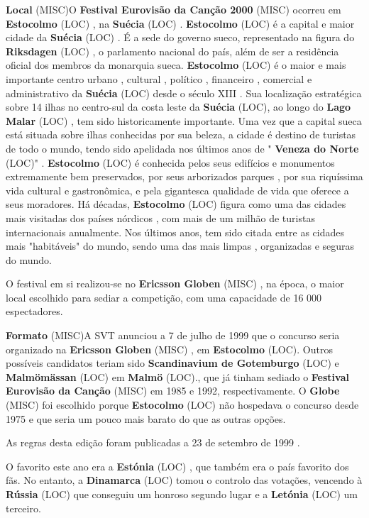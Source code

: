 \documentclass[12pt,a4paper]{article}
\begin{document}
\textbf{Local} (MISC)O \textbf{Festival Eurovisão da Canção 2000} (MISC) ocorreu em \textbf{Estocolmo} (LOC) , na \textbf{Suécia} (LOC) . \textbf{Estocolmo} (LOC) é a capital e maior cidade da \textbf{Suécia} (LOC) . É a sede do governo sueco, representado na figura do \textbf{Riksdagen} (LOC) , o parlamento nacional do país, além de ser a residência oficial dos membros da monarquia sueca. \textbf{Estocolmo} (LOC) é o maior e mais importante centro urbano , cultural , político , financeiro , comercial e administrativo da \textbf{Suécia} (LOC) desde o século XIII . Sua localização estratégica sobre 14 ilhas no centro-sul da costa leste da \textbf{Suécia} (LOC), ao longo do \textbf{Lago Malar} (LOC) , tem sido historicamente importante. Uma vez que a capital sueca está situada sobre ilhas conhecidas por sua beleza, a cidade é destino de turistas de todo o mundo, tendo sido apelidada nos últimos anos de " \textbf{Veneza do Norte} (LOC)" . \textbf{Estocolmo} (LOC) é conhecida pelos seus edifícios e monumentos extremamente bem preservados, por seus arborizados parques , por sua riquíssima vida cultural e gastronômica, e pela gigantesca qualidade de vida que oferece a seus moradores. Há décadas, \textbf{Estocolmo} (LOC) figura como uma das cidades mais visitadas dos países nórdicos , com mais de um milhão de turistas internacionais anualmente. Nos últimos anos, tem sido citada entre as cidades mais "habitáveis" do mundo, sendo uma das mais limpas , organizadas e seguras do mundo.

O festival em si realizou-se no \textbf{Ericsson Globen} (MISC) , na época, o maior local escolhido para sediar a competição, com uma capacidade de 16 000 espectadores.



\textbf{Formato} (MISC)A SVT anunciou a 7 de julho de 1999 que o concurso seria organizado na \textbf{Ericsson Globen} (MISC) , em \textbf{Estocolmo} (LOC). Outros possíveis candidatos teriam sido \textbf{Scandinavium de Gotemburgo} (LOC) e \textbf{Malmömässan} (LOC) em \textbf{Malmö} (LOC)., que já tinham sediado o \textbf{Festival Eurovisão da Canção} (MISC) em 1985 e 1992, respectivamente. O \textbf{Globe} (MISC) foi escolhido porque \textbf{Estocolmo} (LOC) não hospedava o concurso desde 1975 e que seria um pouco mais barato do que as outras opções.

As regras desta edição foram publicadas a 23 de setembro de 1999 .

O favorito este ano era a \textbf{Estónia} (LOC) , que também era o país favorito dos fãs. No entanto, a \textbf{Dinamarca} (LOC) tomou o controlo das votações, vencendo à \textbf{Rússia} (LOC) que conseguiu um honroso segundo lugar e a \textbf{Letónia} (LOC) um terceiro.
\end{document}
